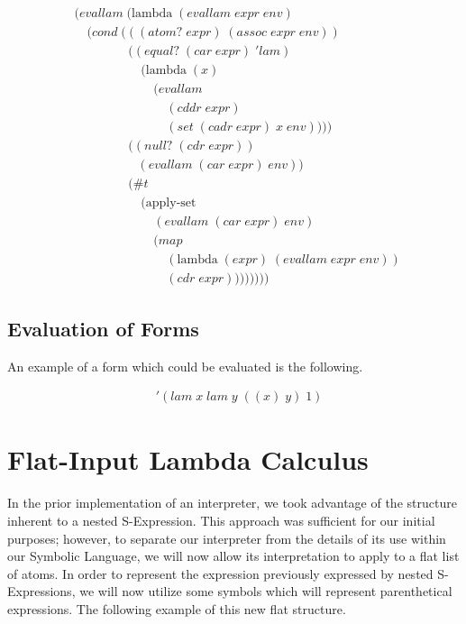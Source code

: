 \begin{align*}
& (evallam \; (\text{lambda} \; (evallam \; expr \; env)
\\& \quad (cond \; (((atom? \; expr) \; (assoc \; expr \; env))
\\& \qquad \qquad \; ((equal? \; (car \; expr) \; 'lam) \; 
\\& \qquad \qquad \quad \; (\text{lambda} \; (x) \; 
\\& \qquad \qquad \qquad \; (evallam \; 
\\& \qquad \qquad \qquad \quad \; (cddr \; expr) \; 
\\& \qquad \qquad \qquad \quad \; (set \; (cadr \; expr) \; x \; env))))
\\& \qquad \qquad \; ((null? \; (cdr \; expr)) \; 
\\& \qquad \qquad \quad (evallam \; (car \; expr) \; env))
\\& \qquad \qquad \; (\#t \; 
\\& \qquad \qquad \quad \; (\text{apply-set} \; 
\\& \qquad \qquad \qquad \; (evallam \; (car \; expr) \; env) \; 
\\& \qquad \qquad \qquad \; (map \; 
\\& \qquad \qquad \qquad \quad \; (\text{lambda} \; (expr) \; (evallam \; expr \; env)) \; 
\\& \qquad \qquad \qquad \quad \; (cdr \; expr))))))))
\end{align*}

\subsection{Evaluation of Forms}
An example of a form which could be evaluated is the following.

\begin{align*}
& '(lam \; x \; lam \; y \; ((x) \; y) \; 1)
\end{align*}

\section{Flat-Input Lambda Calculus}
In the prior implementation of an interpreter, we took advantage of the structure 
inherent to a nested S-Expression. This approach was sufficient for our initial 
purposes; however, to separate our interpreter from the details of its use within 
our Symbolic Language, we will now allow its interpretation to apply to a flat 
list of atoms.
In order to represent the expression previously expressed by nested S-Expressions, 
we will now utilize some symbols which will represent parenthetical expressions. 
The following example of this new flat structure.

